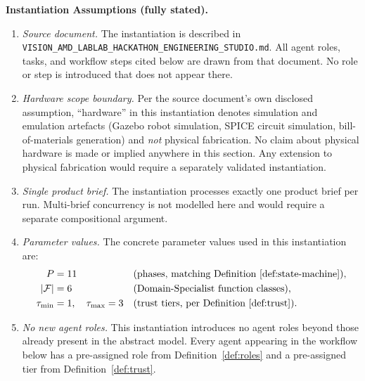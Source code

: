 \documentclass[12pt]{article}
\theoremstyle{definition}
\newcommand{\code}[1]{\texttt{#1}}
\newcommand{\VisionHackathon}{\code{VISION\_AMD\_\allowbreak LABLAB\_\allowbreak HACKATHON\_\allowbreak ENGINEERING\_STUDIO.md}}
\begin{document}
\medskip
\noindent\textbf{Instantiation Assumptions (fully stated).}
\begin{enumerate}
    \item[A1] \emph{Source document.}  The instantiation is described in
              \VisionHackathon{}.  All agent roles, tasks, and
              workflow steps cited below are drawn from that document.
              No role or step is introduced that does not appear there.

    \item[A2] \emph{Hardware scope boundary.}  Per the source document's
              own disclosed assumption, ``hardware'' in this instantiation
              denotes simulation and emulation artefacts (Gazebo robot
              simulation, SPICE circuit simulation, bill-of-materials
              generation) and \emph{not} physical fabrication.  No claim
              about physical hardware is made or implied anywhere in this
              section.  Any extension to physical fabrication would
              require a separately validated instantiation.

    \item[A3] \emph{Single product brief.}  The instantiation processes
              exactly one product brief per run.  Multi-brief concurrency
              is not modelled here and would require a separate
              compositional argument.

    \item[A4] \emph{Parameter values.}  The concrete parameter values
              used in this instantiation are:
              \begin{align}
                  P       &= 11
                  &&\text{(phases, matching Definition~\ref{def:state-machine})},
                  \notag\\
                  |\mathcal{F}| &= 6
                  &&\text{(Domain-Specialist function classes)},
                  \notag\\
                  \tau_{\mathrm{min}} &= 1,\quad \tau_{\mathrm{max}} = 3
                  &&\text{(trust tiers, per Definition~\ref{def:trust})}.
                  \notag
              \end{align}

    \item[A5] \emph{No new agent roles.}  This instantiation introduces
              no agent roles beyond those already present in the abstract
              model.  Every agent appearing in the workflow below has a
              pre-assigned role from Definition~\ref{def:roles} and a
              pre-assigned tier from Definition~\ref{def:trust}.
\end{enumerate}
\end{document}
